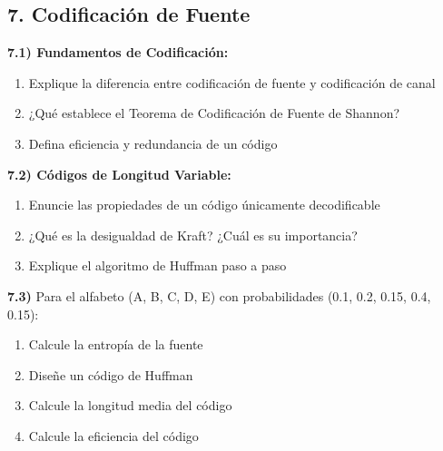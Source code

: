 \subsection*{7. Codificación de Fuente}

\textbf{7.1) Fundamentos de Codificación:}
\begin{enumerate}[label=\alph*)]
    \item Explique la diferencia entre codificación de fuente y codificación de canal
    \item ¿Qué establece el Teorema de Codificación de Fuente de Shannon?
    \item Defina eficiencia y redundancia de un código
\end{enumerate}

\textbf{7.2) Códigos de Longitud Variable:}
\begin{enumerate}[label=\alph*)]
    \item Enuncie las propiedades de un código únicamente decodificable
    \item ¿Qué es la desigualdad de Kraft? ¿Cuál es su importancia?
    \item Explique el algoritmo de Huffman paso a paso
\end{enumerate}

\textbf{7.3)} Para el alfabeto (A, B, C, D, E) con probabilidades (0.1, 0.2, 0.15, 0.4, 0.15):
\begin{enumerate}[label=\alph*)]
    \item Calcule la entropía de la fuente
    \item Diseñe un código de Huffman
    \item Calcule la longitud media del código
    \item Calcule la eficiencia del código
\end{enumerate}
